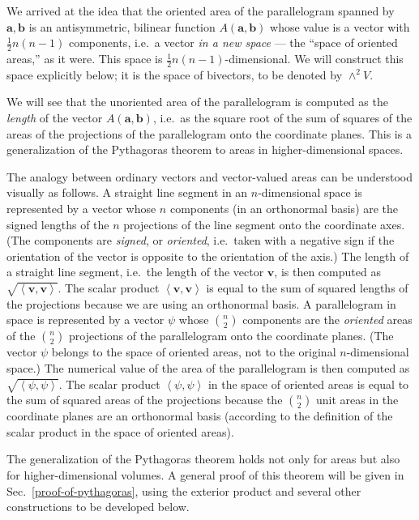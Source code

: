We arrived at the idea that the oriented area of the parallelogram
spanned by $\mathbf{a},\mathbf{b}$ is an antisymmetric, bilinear
function $A(\mathbf{a},\mathbf{b})$ whose value is a vector with
$\frac{1}{2}n(n-1)$ components, i.e.~a vector \emph{in a new space}
--- the {}``space of oriented areas,'' as it were. This space is
$\frac{1}{2}n(n-1)$-dimen\-sion\-al. We will construct this space
explicitly below; it is the space of bivectors, to be denoted by $\wedge^{2}V$. 

We will see that the unoriented area of the parallelogram is computed
as the \emph{length} of the vector $A(\mathbf{a},\mathbf{b})$, i.e.~as
the square root of the sum of squares of the areas of the projections
of the parallelogram onto the coordinate planes. This is a generalization
of the Pythagoras theorem to areas in higher-dimen\-sion\-al spaces.

The analogy between ordinary vectors and vector-val\-ued areas can
be understood visually as follows. A straight line segment in an $n$-dimen\-sion\-al
space is represented by a vector whose $n$ components (in an orthonormal
basis) are the signed lengths of the $n$ projections of the line
segment onto the coordinate axes. (The components are \emph{signed},
or \emph{oriented}, i.e.~taken with a negative sign if the orientation
of the vector is opposite to the orientation of the axis.) The length
of a straight line segment, i.e.~the length of the vector $\mathbf{v}$,
is then computed as $\sqrt{\left\langle \mathbf{v},\mathbf{v}\right\rangle }$.
The scalar product $\left\langle \mathbf{v},\mathbf{v}\right\rangle $
is equal to the sum of squared lengths of the projections because
we are using an orthonormal basis. A parallelogram in space is represented
by a vector $\psi$ whose ${n \choose 2}$ components are the \emph{oriented}
areas of the ${n \choose 2}$ projections of the parallelogram onto
the coordinate planes. (The vector $\psi$ belongs to the space of
oriented areas, not to the original $n$-dimen\-sion\-al space.)
The numerical value of the area of the parallelogram is then computed
as $\sqrt{\left\langle \psi,\psi\right\rangle }$. The scalar product
$\left\langle \psi,\psi\right\rangle $ in the space of oriented areas
is equal to the sum of squared areas of the projections because the
${n \choose 2}$ unit areas in the coordinate planes are an orthonormal
basis (according to the definition of the scalar product in the space
of oriented areas).

The generalization of the Pythagoras theorem holds not only for areas
but also for higher-dimen\-sion\-al volumes. A general proof of
this theorem will be given in Sec.~\ref{proof-of-pythagoras}, using
the exterior product and several other constructions to be developed
below.


